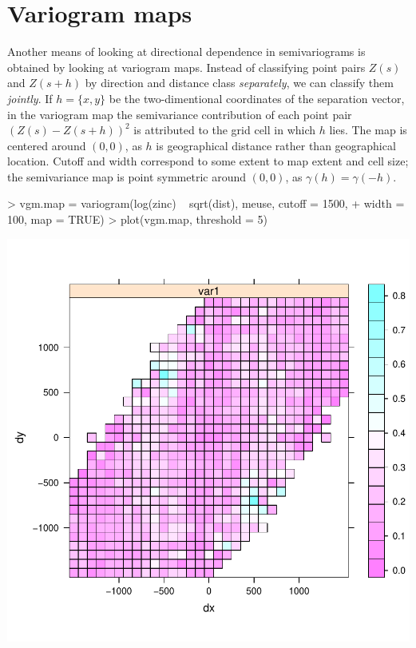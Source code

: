 \documentclass[a4paper]{article}
\begin{document}
\section{Variogram maps}

Another means of looking at directional dependence in semivariograms
is obtained by looking at variogram maps. Instead of classifying
point pairs $Z(s)$ and $Z(s+h)$ by direction and distance class {\em
separately}, we can classify them {\em jointly}. If $h=\{x,y\}$ be the
two-dimentional coordinates of the separation vector, in the variogram
map the semivariance contribution of each point pair $(Z(s)-Z(s+h))^2$
is attributed to the grid cell in which $h$ lies. The map is centered
around $(0,0)$, as $h$ is geographical distance rather than geographical
location. Cutoff and width correspond to some extent to map extent
and cell size; the semivariance map is point symmetric around $(0,0)$,
as $\gamma(h)=\gamma(-h)$.

\begin{Schunk}
\begin{Sinput}
> vgm.map = variogram(log(zinc) ~ sqrt(dist), meuse, cutoff = 1500, 
+     width = 100, map = TRUE)
> plot(vgm.map, threshold = 5)
\end{Sinput}
\end{Schunk}

\includegraphics{gstat-021}
\end{document}
